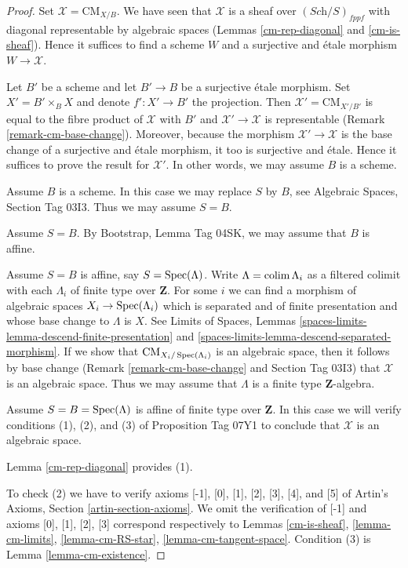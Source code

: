 \documentclass{stacks-project}
\theoremstyle{plain}
\theoremstyle{definition}
\DeclareMathOperator{\Spec}{Spec}
\theoremstyle{remark}
\numberwithin{equation}{subsection}
\def\colim{\mathop{\rm colim}\nolimits}
\def\Spec{\mathop{\rm Spec}}
\def\Sch{\textit{Sch}}
\def\CMfunctor{\mathcal{C}\!{\it oh}}
\def\CMfunctor{\text{CM}}
\begin{document}
\begin{proof}
Set $\mathcal{X} = \CMfunctor_{X/B}$. We have seen that $\mathcal{X}$
is a sheaf over $(\Sch/S)_{fppf}$ with diagonal representable
by algebraic spaces
(Lemmas \ref{cm-rep-diagonal} and \ref{cm-is-sheaf}).
Hence it suffices to find a scheme $W$ and a surjective and \'etale
morphism $W \to \mathcal{X}$.

\medskip\noindent
Let $B'$ be a scheme and let $B' \to B$ be a surjective \'etale morphism.
Set $X' = B' \times_B X$ and denote $f' : X' \to B'$ the projection.
Then $\mathcal{X}' = \CMfunctor_{X'/B'}$ is equal to the fibre
product of $\mathcal{X}$ with $B'$ and $\mathcal{X}'\rightarrow\mathcal{X}$ is representable
(Remark \ref{remark-cm-base-change}). 
Moreover, because the morphism $\mathcal{X}' \to \mathcal{X}$ is the base change of a surjective and \'etale morphism, it too is surjective and \'etale.
Hence it suffices to prove the result for $\mathcal{X}'$.
In other words, we may assume $B$ is a scheme.

\medskip\noindent
Assume $B$ is a scheme. In this case we may replace $S$ by $B$, see
Algebraic Spaces, Section Tag 03I3.
Thus we may assume $S = B$.

\medskip\noindent
Assume $S = B$.
By Bootstrap, Lemma Tag 04SK, we may assume that $B$ is affine.

\medskip\noindent
Assume $S = B$ is affine, say $S = \Spec(\Lambda)$.
Write $\Lambda = \colim \Lambda_i$ as a filtered colimit with each $\Lambda_i$
of finite type over $\mathbf{Z}$. For some $i$ we can find
a morphism of algebraic spaces $X_i \to \Spec(\Lambda_i)$
which is separated and of finite presentation and whose base change
to $\Lambda$ is $X$. See Limits of Spaces, Lemmas
\ref{spaces-limits-lemma-descend-finite-presentation} and
\ref{spaces-limits-lemma-descend-separated-morphism}.
If we show that $\CMfunctor_{X_i/\Spec(\Lambda_i)}$ is an
algebraic space, then it follows by base change
(Remark \ref{remark-cm-base-change} and Section Tag 03I3)
that $\mathcal{X}$ is an algebraic space.
Thus we may assume that $\Lambda$ is a finite type $\mathbf{Z}$-algebra.

\medskip\noindent
Assume $S = B = \Spec(\Lambda)$ is affine of finite type over $\mathbf{Z}$.
In this case we will verify conditions (1), (2), and (3) of 
Proposition Tag 07Y1
to conclude that $\mathcal{X}$ is an algebraic space.

\medskip\noindent
Lemma \ref{cm-rep-diagonal} provides (1).

\medskip\noindent
To check (2) we have to verify axioms [-1], [0], [1], [2], [3], [4], and [5]
of Artin's Axioms, Section \ref{artin-section-axioms}.
We omit the verification of [-1] and axioms
[0], [1], [2], [3] correspond respectively to
Lemmas \ref{cm-is-sheaf},
\ref{lemma-cm-limits},
\ref{lemma-cm-RS-star},
\ref{lemma-cm-tangent-space}.
Condition (3) is Lemma \ref{lemma-cm-existence}.


\end{proof}
\end{document}
